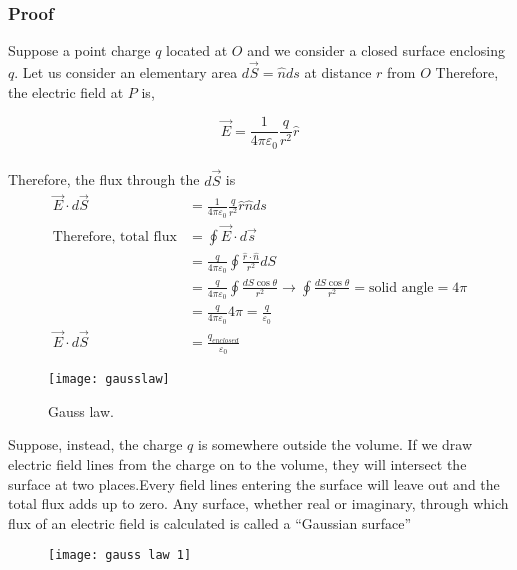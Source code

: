 \subsubsection{Proof}
Suppose a point charge $q$ located at $O$ and we consider a closed surface enclosing $q$. Let us consider an elementary area $d \vec{S}=\hat{n} d s$ at distance $r$ from $O$ Therefore, the electric field at $P$ is,\\
\begin{minipage}{0.70\textwidth}
	$$
	\vec{E}=\frac{1}{4 \pi \varepsilon_{0}} \frac{q}{r^{2}} \hat{r}
	$$
	\\Therefore, the flux through the $d \vec{S}$ is
\begin{align*}
\vec{E} \cdot d \vec{S}&=\frac{1}{4 \pi \varepsilon_{0}} \frac{q}{r^{2}} \hat{r} \hat{n} d s\\
\text{Therefore, total flux} &=\oint \vec{E} \cdot d \vec{s}\\
	&=\frac{q}{4 \pi \varepsilon_{0}} \oint \frac{\hat{r} \cdot \hat{n}}{r^{2}} d S\\ 
	&=\frac{q}{4 \pi \varepsilon_{0}} \oint \frac{d S \cos \theta}{r^{2}} \rightarrow\oint \frac{d S \cos \theta}{r^{2}}=\text{solid angle} =4\pi\\
	&=\frac{q}{4 \pi \varepsilon_{0}} 4 \pi=\frac{q}{\varepsilon_{0}}\\
	\vec{E} \cdot d \vec{S}&=\frac{q_{enclosed}}{\varepsilon_{0}}
\end{align*}
\end{minipage}
\begin{minipage}{0.30\textwidth}
\begin{figure}[H]
	\texttt{[image: gausslaw]}
	\caption{Gauss law.}
\end{figure}
\end{minipage}
\begin{note}
	Suppose, instead, the charge $ q $ is somewhere outside the volume.  If we draw electric field lines from the charge on to the volume,  they will intersect the surface at two places.Every field lines entering the surface will leave out and the total flux adds up to zero. Any surface, whether real or imaginary, through which flux of an electric field  is calculated is called a “Gaussian surface”
\end{note}

\begin{figure}[H]
	\begin{center}
		\texttt{[image: gauss law 1]}
	\end{center}
\end{figure}

